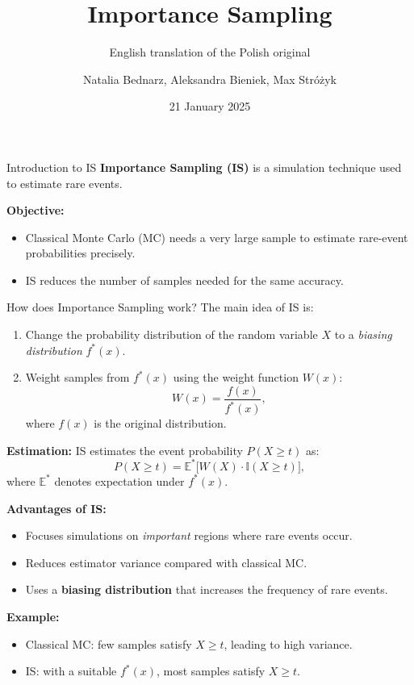 \documentclass{beamer}
\title{Importance Sampling}
\subtitle{English translation of the Polish original}
\author{Natalia Bednarz, Aleksandra Bieniek, Max Stróżyk}
\date{21 January 2025}
\begin{document}
\begin{frame}
    \titlepage
\end{frame}

\begin{frame}{Introduction to IS}
    \textbf{Importance Sampling (IS)} is a simulation technique used to estimate rare events.
    
    \vspace{0.5cm}
    \textbf{Objective:}
    \begin{itemize}
        \item Classical Monte Carlo (MC) needs a very large sample to estimate rare-event probabilities precisely.
        \item IS reduces the number of samples needed for the same accuracy.
    \end{itemize}
\end{frame}

\begin{frame}{How does Importance Sampling work?}
    The main idea of IS is:
    \begin{enumerate}
        \item Change the probability distribution of the random variable $X$ to a \textit{biasing distribution} $f^*(x)$.
        \item Weight samples from $f^*(x)$ using the weight function $W(x)$:
        \[
        W(x) = \frac{f(x)}{f^*(x)},
        \]
        where $f(x)$ is the original distribution.
    \end{enumerate}

    \vspace{0.5cm}
    \textbf{Estimation:}
    IS estimates the event probability $P(X \geq t)$ as:
    \[
    P(X \geq t) = \mathbb{E}^*\big[W(X) \cdot \mathbb{I}(X \geq t)\big],
    \]
    where $\mathbb{E}^*$ denotes expectation under $f^*(x)$.
\end{frame}

\begin{frame}
    \textbf{Advantages of IS:}
    \begin{itemize}
        \item Focuses simulations on \textit{important} regions where rare events occur.
        \item Reduces estimator variance compared with classical MC.
        \item Uses a \textbf{biasing distribution} that increases the frequency of rare events.
    \end{itemize}

    \vspace{0.5cm}
    \textbf{Example:}
    \begin{itemize}
        \item Classical MC: few samples satisfy $X \geq t$, leading to high variance.
        \item IS: with a suitable $f^*(x)$, most samples satisfy $X \geq t$.
    \end{itemize}
\end{frame}
\end{document}
